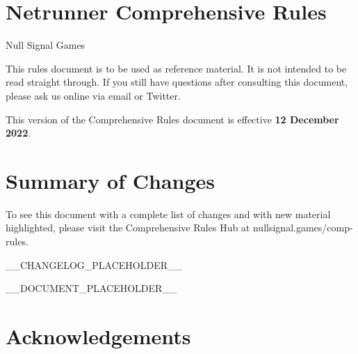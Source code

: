\documentclass{article}
\newcommand{\subtitle}[1]{{\Large #1 \vspace{2ex}}}
\begin{document}

\section*{Netrunner Comprehensive Rules}
\subtitle{Null Signal Games}

\noindent
This rules document is to be used as reference material. It is not intended to be read straight through. If you still have questions after consulting this document, please ask us online via email or Twitter.

\noindent
This version of the Comprehensive Rules document is effective \textbf{12 December 2022}.

\section*{Summary of Changes}

\noindent
To see this document with a complete list of changes and with new material highlighted, please visit the Comprehensive Rules Hub at \textlangle{}nullsignal.games/comp-rules\textrangle.

__CHANGELOG_PLACEHOLDER__


\newpage


\begin{multicols}{2}
  \tableofcontents
\end{multicols}


\newpage


__DOCUMENT_PLACEHOLDER__


\newpage

\section*{Acknowledgements}
\end{document}
